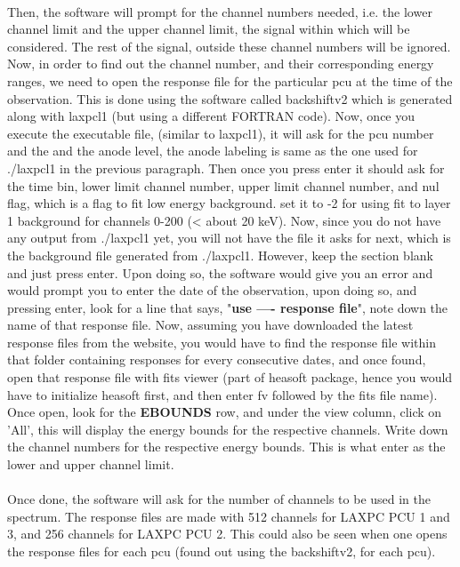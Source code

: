 \documentclass[a4paper,twoside]{report}
\numberwithin{equation}{section}
\begin{document}
\paragraph{}
Then, the software will prompt for the channel numbers needed, i.e. the lower channel limit and the upper channel limit, the signal within which will be considered. The rest of the signal, outside these channel numbers will be ignored. Now, in order to find out the channel number, and their corresponding energy ranges, we need to open the response file for the particular pcu at the time of the observation. This is done using the software called backshiftv2 which is generated along with laxpcl1 (but using a different FORTRAN code). Now, once you execute the executable file, (similar to laxpcl1), it will ask for the pcu number and the and the anode level, the anode labeling is same as the one used for ./laxpcl1 in the previous paragraph. Then once you press enter it should ask for the time bin, lower limit channel number, upper limit channel number, and nul flag, which is a flag to fit low energy background. set it to -2 for using fit to layer 1 background for channels 0-200 (< about 20 keV). Now, since you do not have any output from ./laxpcl1 yet, you will not have the file it asks for next, which is the background file generated from ./laxpcl1. However, keep the section blank and just press enter. Upon doing so, the software would give you an error and would prompt you to enter the date of the observation, upon doing so, and pressing enter, look for a line that says, "\textbf{use ---- response file}", note down the name of that response file. Now, assuming you have downloaded the latest response files from the website, you would have to find the response file within that folder containing responses for every consecutive dates, and once found, open that response file with fits viewer (part of heasoft package, hence you would have to initialize heasoft first, and then enter fv followed by the fits file name). Once open, look for the \textbf{EBOUNDS} row, and under the view column, click on 'All', this will display the energy bounds for the respective channels. Write down the channel numbers for the respective energy bounds. This is what enter as the lower and upper channel limit. 
\paragraph{}
Once done, the software will ask for the number of channels to be used in the spectrum. The response files are made with 512 channels for LAXPC PCU 1 and 3, and 256 channels for LAXPC PCU 2. This could also be seen when one opens the response files for each pcu (found out using the backshiftv2, for each pcu). 
\end{document}
